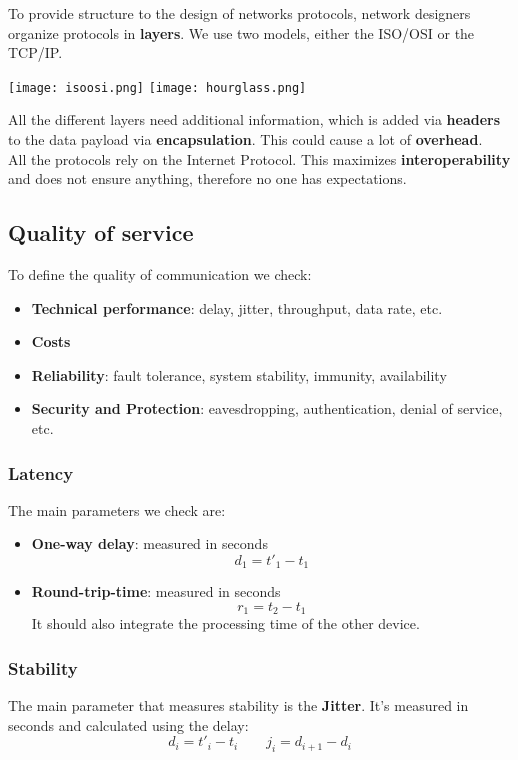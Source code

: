 \noindent To provide structure to the design of networks protocols, network designers organize protocols in \textbf{layers}. We use two models, either the ISO/OSI or the TCP/IP.
\begin{center}
	\texttt{[image: isoosi.png]}
	\texttt{[image: hourglass.png]}
\end{center}

\noindent All the different layers need additional information, which is added via \textbf{headers} to the data payload via \textbf{encapsulation}. This could cause a lot of \textbf{overhead}.\\
All the protocols rely on the Internet Protocol. This maximizes \textbf{interoperability} and does not ensure anything, therefore no one has expectations.

\subsection{Quality of service}
To define the quality of communication we check:
\begin{itemize}
	\item \textbf{Technical performance}: delay, jitter, throughput, data rate, etc.
	\item \textbf{Costs}
	\item \textbf{Reliability}: fault tolerance, system stability, immunity, availability
	\item \textbf{Security and Protection}: eavesdropping, authentication, denial of service, etc.
\end{itemize}

\subsubsection{Latency}
The main parameters we check are:
\begin{itemize}
	\item \textbf{One-way delay}: measured in seconds
	\begin{equation}
		d_1 = t'_1-t_1
	\end{equation}
	\item \textbf{Round-trip-time}: measured in seconds
	\begin{equation}
		r_1 = t_2 - t_1
	\end{equation}
	It should also integrate the processing time of the other device.
\end{itemize}

\subsubsection{Stability}
The main parameter that measures stability is the \textbf{Jitter}. It's measured in seconds and calculated using the delay:
\begin{equation}
	d_i = t'_i - t_i \quad\quad j_i = d_{i+1} - d_i
\end{equation}

